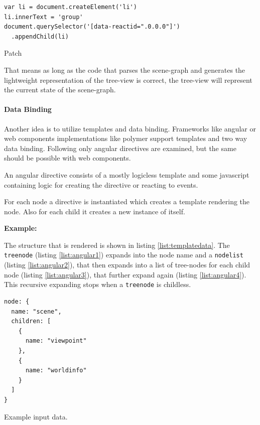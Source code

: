 \begin{listing}[H]
  \begin{verbatim}
var li = document.createElement('li')
li.innerText = 'group'
document.querySelector('[data-reactid=".0.0.0"]')
  .appendChild(li)
  \end{verbatim}
  \caption{Patch}
  \label{patch}
\end{listing}

That means as long as the code that parses the scene-graph and generates the
lightweight representation of the tree-view is correct, the tree-view will
represent the current state of the scene-graph.

\paragraph{Data Binding}
\label{data-binding}

Another idea is to utilize templates and data binding. Frameworks like
angular or web components implementations like polymer
support templates and two way data binding. Following only
angular directives are examined, but the same should be possible with web
components.

An angular directive consists of a mostly logicless template and some
javascript containing logic for creating the directive or reacting to
events.

For each node a directive is instantiated which creates a template
rendering the node. Also for each child it creates a new instance of
itself.

\textbf{Example:}

The structure that is rendered is shown in listing \ref{list:templatedata}. The
\texttt{treenode} (listing \ref{list:angular1}) expands into the node name and a
\texttt{nodelist} (listing \ref{list:angular2}), that then expands into a list
of tree-nodes for each child node (listing \ref{list:angular3}), that further
expand again (listing \ref{list:angular4}). This recursive expanding stops when a
\texttt{treenode} is childless.

\begin{listing}[H]
  \begin{verbatim}
node: {
  name: "scene",
  children: [
    {
      name: "viewpoint"
    },
    {
      name: "worldinfo"
    }
  ]
}
  \end{verbatim}
  \caption{Example input data.}
  \label{list:templatedata}
\end{listing}

